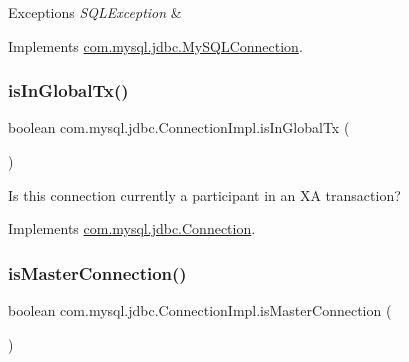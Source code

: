 \begin{DoxyExceptions}{Exceptions}
{\em S\+Q\+L\+Exception} & \\
\hline
\end{DoxyExceptions}


Implements \mbox{\hyperlink{interfacecom_1_1mysql_1_1jdbc_1_1_my_s_q_l_connection}{com.\+mysql.\+jdbc.\+My\+S\+Q\+L\+Connection}}.

\mbox{\label{classcom_1_1mysql_1_1jdbc_1_1_connection_impl_a5d92d55b2f7afca920591ae53c73a1cd}} 
\subsubsection{\texorpdfstring{is\+In\+Global\+Tx()}{isInGlobalTx()}}
{\footnotesize\ttfamily boolean com.\+mysql.\+jdbc.\+Connection\+Impl.\+is\+In\+Global\+Tx (\begin{DoxyParamCaption}{ }\end{DoxyParamCaption})}

Is this connection currently a participant in an XA transaction? 

Implements \mbox{\hyperlink{interfacecom_1_1mysql_1_1jdbc_1_1_connection_a78a9a11946443467d3fbc7838922a205}{com.\+mysql.\+jdbc.\+Connection}}.

\mbox{\label{classcom_1_1mysql_1_1jdbc_1_1_connection_impl_aac202776da9d2d04275ff2bde2c253b4}} 
\subsubsection{\texorpdfstring{is\+Master\+Connection()}{isMasterConnection()}}
{\footnotesize\ttfamily boolean com.\+mysql.\+jdbc.\+Connection\+Impl.\+is\+Master\+Connection (\begin{DoxyParamCaption}{ }\end{DoxyParamCaption})}

